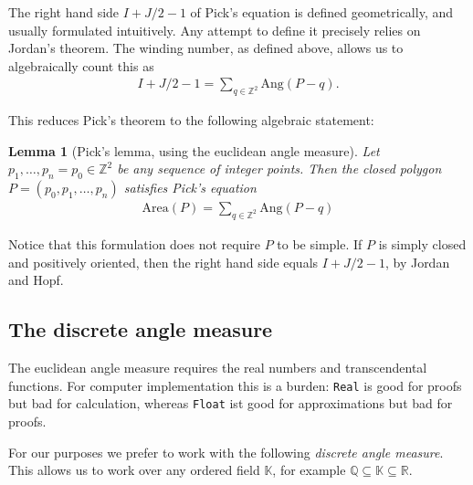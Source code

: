 \documentclass[a4paper]{amsart}
\numberwithin{equation}{section}
\theoremstyle{plain}
\newtheorem{lemma}[theorem]{Lemma}
\theoremstyle{definition}
\newcommand{\Z}{\mathbb{Z}}
\newcommand{\Q}{\mathbb{Q}}
\newcommand{\R}{\mathbb{R}}
\newcommand{\K}{\mathbb{K}}
\newcommand{\Area}{\mathrm{Area}}
\newcommand{\Ang}{\mathrm{Ang}}
\begin{document}
The right hand side $I + J/2 - 1$ of Pick's equation
is defined geometrically, and usually formulated intuitively.
Any attempt to define it precisely relies on Jordan's theorem.
The winding number, as defined above, allows us to algebraically count
this as %
\begin{align}
  I + J/2 - 1  = \sum_{q \in \Z^2} \Ang(P-q) .
\end{align}

This reduces Pick's theorem to the following algebraic statement:

\begin{lemma}[Pick's lemma, using the euclidean angle measure] \label{lem:PickEuclidean}
  Let $p_1,\ldots,p_n=p_0 \in \Z^2$ be any sequence of integer points.
  Then the closed polygon $P = (p_0,p_1,\ldots,p_n)$ satisfies Pick's equation 
  \begin{align}
    \Area(P) = \sum_{q \in \Z^2} \Ang(P-q)
  \end{align}
\end{lemma}

Notice that this formulation does not require $P$ to be simple.
If $P$ is simply closed and positively oriented, 
then the right hand side equals $I + J/2 - 1$,
by Jordan and Hopf.


\subsection{The discrete angle measure}

The euclidean angle measure requires the real numbers and transcendental functions.
For computer implementation this is a burden:
\texttt{Real} is good for proofs but bad for calculation,
whereas \texttt{Float} ist good for approximations but bad for proofs.

For our purposes we prefer to work with the following \emph{discrete angle measure}.
This allows us to work over any ordered field $\K$,
for example $\Q \subseteq \K \subseteq \R$.
\end{document}
